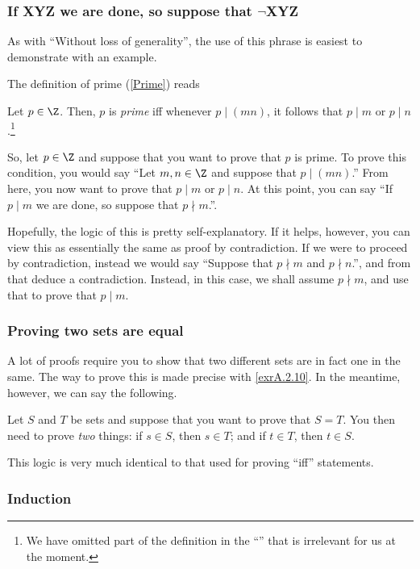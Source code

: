 \subsubsection{If XYZ we are done, so suppose that \texorpdfstring{$\neg$}{not}XYZ}

As with ``Without loss of generality\textellipsis '', the use of this phrase is easiest to demonstrate with an example.

The definition of prime (\cref{Prime}) reads
\begin{displayquote}
Let $p\in \Z$.  Then, $p$ is \emph{prime} iff \textellipsis whenever $p\mid (mn)$, it follows that $p\mid m$ or $p\mid n$.\footnote{We have omitted part of the definition in the ``\textellipsis'' that is irrelevant for us at the moment.}
\end{displayquote}
So, let $p\in \Z$ and suppose that you want to prove that $p$ is prime.  To prove this condition, you would say ``Let $m,n\in \Z$ and suppose that $p\mid (mn)$.''  From here, you now want to prove that $p\mid m$ or $p\mid n$.  At this point, you can say ``If $p\mid m$ we are done, so suppose that $p\nmid m$.''.

Hopefully, the logic of this is pretty self-explanatory.  If it helps, however, you can view this as essentially the same as proof by contradiction.  If we were to proceed by contradiction, instead we would say ``Suppose that $p\nmid m$ and $p\nmid n$.'', and from that deduce a contradiction.  Instead, in this case, we shall assume $p\nmid m$, and use that to prove that $p\mid m$.

\subsubsection{Proving two sets are equal}

A lot of proofs require you to show that two different sets are in fact one in the same.  The way to prove this is made precise with \cref{exrA.2.10}.  In the meantime, however, we can say the following.
\begin{important}
Let $S$ and $T$ be sets and suppose that you want to prove that $S=T$.  You then need to prove \emph{two} things:  if $s\in S$, then $s\in T$; and if $t\in T$, then $t\in S$.
\end{important}
This logic is very much identical to that used for proving ``iff'' statements.

\subsubsection{Induction}

